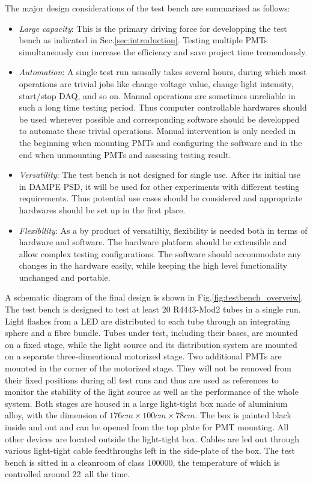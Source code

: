 \documentclass[5p, times]{elsarticle}
\begin{document}
The major design considerations of the test bench are summarized as follows:
\begin{itemize}
 \item \textit{Large capacity}: This is the primary driving force for developping the test bench as indicated in Sec.\ref{sec:introduction}.
 Testing multiple PMTs simultaneously can increase the efficiency and save project time tremendously. 
 \item \textit{Automation}: A single test run ususally takes several hours,  during which most operations are trivial jobs like change voltage value, change light intensity, start/stop DAQ, and so on.
 Manual operations are sometimes unreliable in such a long time testing period.
 Thus computer controllable hardwares should be used wherever possible and corresponding software should be developped to automate these trivial operations.
 Manual intervention is only needed in the beginning when mounting PMTs and configuring the software and in the end when unmounting PMTs and assessing testing result. 
 \item \textit{Versatility}: The test bench is not designed for single use.
 After its initial use in DAMPE PSD, it will be used for other experiments with different testing requirements.
 T\-h\-u\-s potential use cases should be considered and appropriate hardwares should be set up in the first place.
 \item \textit{Flexibility}: As a by product of versatiltiy, flexibility is needed both in terms of hardware and software.
 The hardware platform should be extensible and allow complex testing configurations.
 The software should accommodate any changes in the hardware easily, while keeping the high level functionality unchanged and portable. 
\end{itemize}

A schematic diagram of the final design is shown in Fig.\ref{fig:testbench_overveiw}.
The test bench is designed to test at least 20 R4443-Mod2 tubes in a single run.
Light flashes from a LED are distributed to each tube through an integrating sphere and a fibre bundle.
Tubes under test, including their bases, are mounted on a fixed stage, while the light source and its distribution system are mounted on a separate three-dimentional motorized stage.
Two additional PMTs are mounted in the corner of the motorized stage.
They will not be removed from their fixed positions during all test runs and thus are used as references to monitor the stability of the light source as well as the performance of the whole system.
Both stages are housed in a large light-tight box made of aluminium alloy, with the dimension of $176cm\times100cm\times78cm$.
The box is painted black inside and out and can be opened from the top plate for PMT mounting.
All other devices are located outside the light-tight box.
Cables are led out through various light-tight cable feedthroughs left in the side-plate of the box.
The test bench is sitted in a cleanroom of class 100000, the temperature of which is controlled around 22\textcelsius~all the time.
\end{document}
